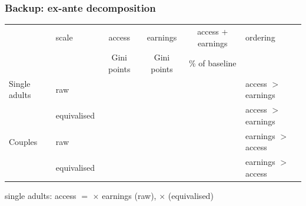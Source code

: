 \documentclass[10pt,aspectratio=169]{beamer}
\begin{document}
\begin{frame}
\frametitle{Backup: ex-ante decomposition}
\vfill
\begin{center}\small
\begin{tabular}{llcccl}
\toprule
 & scale & \textcolor{chacc}{access} & \textcolor{chearn}{earnings} & access + earnings & ordering \\
 & & Gini points & Gini points & \% of baseline & \\
\midrule
Single adults & raw & \VEASingPhiARaw{} & \VEASingPhiBRaw{} & \VEASingOppRaw{} & access $>$ earnings \\
              & equivalised & \VEASingPhiAEq{} & \VEASingPhiBEq{} & \VEASingOppEq{} & access $>$ earnings \\
\midrule
Couples & raw & \VEACoupPhiARaw{} & \VEACoupPhiBRaw{} & \VEACoupOppRaw{} & earnings $>$ access \\
        & equivalised & \VEACoupPhiAEq{} & \VEACoupPhiBEq{} & \VEACoupOppEq{} & earnings $>$ access \\
\bottomrule
\end{tabular}
\end{center}
\vfill
\begin{center}
{\small single adults: access $=$ \VEASingRatioRaw{} $\times$ earnings (raw), \VEASingRatioEq{} $\times$ (equivalised)}
\end{center}
\vfill
{}
\end{frame}
\end{document}
